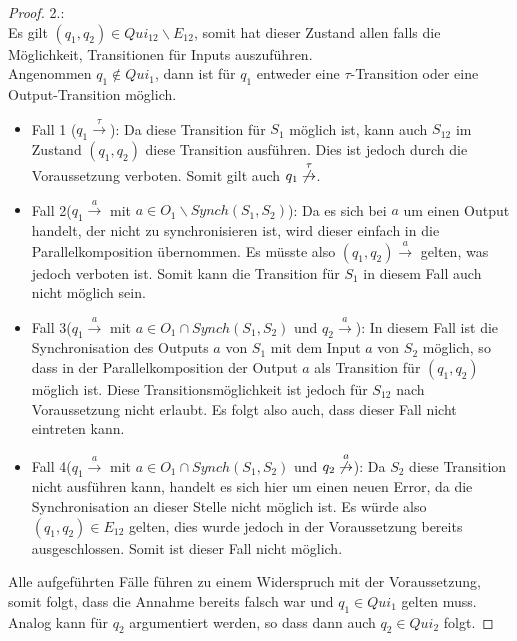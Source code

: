 \begin{proof}
  2.:\\
  Es gilt $(q_1,q_2)\in Qui_{12}\backslash E_{12}$, somit hat
  dieser Zustand allen falls die Möglichkeit, Transitionen für Inputs
  auszuführen.\\
  Angenommen $q_1\notin Qui_1$, dann ist für $q_1$ entweder eine
  $\tau$-Transition oder eine Output-Transition möglich.
  \begin{itemize}
    \item Fall 1 ($q_1 \overset{\tau}{\rightarrow}$): Da diese Transition für
      $S_1$ möglich ist, kann auch $S_{12}$ im Zustand $(q_1,q_2)$ diese
      Transition ausführen. Dies ist jedoch durch die Voraussetzung verboten.
      Somit gilt auch $q_1 \overset{\tau}{\not{\hspace{-0.1cm}\rightarrow}}$.
    \item Fall 2($q_1 \overset{a}{\rightarrow}$ mit $a\in O_1\backslash
      Synch(S_1,S_2)$): Da es sich bei $a$ um einen Output handelt, der nicht
      zu synchronisieren ist, wird dieser einfach in die Parallelkomposition
      übernommen. Es müsste also $(q_1,q_2) \overset{a}{\rightarrow}$ gelten,
      was jedoch verboten ist. Somit kann die Transition für $S_1$ in diesem
      Fall auch nicht möglich sein.
    \item Fall 3($q_1 \overset{a}{\rightarrow}$ mit $a\in O_1\cap
      Synch(S_1,S_2)$ und $q_2 \overset{a}{\rightarrow}$): In diesem Fall ist
      die Synchronisation des Outputs $a$ von $S_1$ mit dem Input $a$ von $S_2$
      möglich, so dass in der Parallelkomposition der Output $a$ als Transition
      für $(q_1,q_2)$ möglich ist. Diese Transitionsmöglichkeit ist jedoch für
      $S_{12}$ nach Voraussetzung nicht erlaubt. Es folgt also auch, dass
      dieser Fall nicht eintreten kann.
    \item Fall 4($q_1 \overset{a}{\rightarrow}$ mit $a\in O_1\cap
      Synch(S_1,S_2)$ und $q_2 \overset{a}{\not{\hspace{-0.1cm}\rightarrow}}$):
      Da $S_2$ diese Transition nicht ausführen kann, handelt es sich hier um
      einen neuen Error, da die Synchronisation an dieser Stelle nicht möglich
      ist. Es würde also $(q_1,q_2)\in E_{12}$ gelten, dies wurde jedoch in der
      Voraussetzung bereits ausgeschlossen. Somit ist dieser Fall nicht
      möglich.
  \end{itemize}
  Alle aufgeführten Fälle führen zu einem Widerspruch mit der Voraussetzung,
  somit folgt, dass die Annahme bereits falsch war und $q_1\in Qui_1$ gelten
  muss. Analog kann für $q_2$ argumentiert werden, so dass dann auch $q_2\in
  Qui_2$ folgt.
\end{proof}


